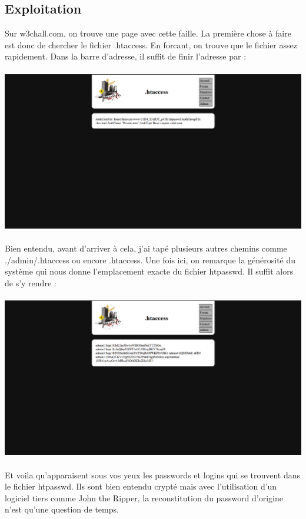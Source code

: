 \documentclass{article}
\begin{document}
\subsection{Exploitation}
\hspace*{0.6cm}Sur w3chall.com, on trouve une page avec cette faille. La premi\`ere chose \`a faire est donc de chercher le fichier .htaccess. En forcant, on trouve que le fichier assez rapidement. Dans la barre d'adresse, il suffit de finir l'adresse par :
\vspace{0.2cm}\\
\vspace{0.2cm}\\
\includegraphics[width=\textwidth]{2}\\
\vspace{0.2cm}\\
Bien entendu, avant d'arriver \`a cela, j'ai tap\'e plusieurs autres chemins comme ./admin/.htaccess ou encore .htaccess. Une fois ici, on remarque la g\'en\'erosit\'e du syst\`eme qui nous donne l'emplacement exacte du fichier htpasswd. Il suffit alors de s'y rendre :
\vspace{0.2cm}\\
\vspace{0.2cm}\\
\includegraphics[width=\textwidth]{3}\\
\vspace{0.2cm}\\
\hspace*{0.6cm}Et voila qu'apparaisent sous vos yeux les passwords et logins qui se trouvent dans le fichier htpasswd. Ils sont bien entendu crypté mais avec l'utilisation d'un logiciel tiers comme John the Ripper, la reconstitution du password d'origine n'est qu'une question de temps.
\end{document}
